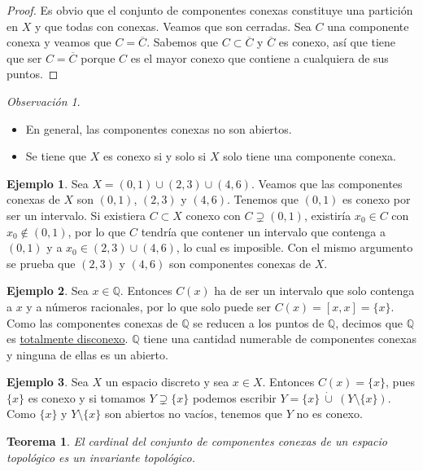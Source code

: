\documentclass[12pt]{report}
\newtheorem{theorem}{Teorema}[chapter]
\theoremstyle{definition}
\theoremstyle{definition}
\newtheorem{example}{Ejemplo}[chapter]
\theoremstyle{remark}
\newtheorem*{obs}{Observación} %
\newcommand{\Q}{\mathbb Q}
\begin{document}
\begin{proof}
Es obvio que el conjunto de componentes conexas constituye una partición en $X$ y que todas con conexas. Veamos que son cerradas. Sea $C$ una componente conexa y veamos que $C = \overline{C}$. Sabemos que $C \subset \overline{C}$ y $\overline{C}$ es conexo, así que tiene que ser $C = \overline{C}$ porque $C$ es el mayor conexo que contiene a cualquiera de sus puntos.
\end{proof}

\begin{obs}
\hfill
\begin{itemize}
    \item En general, las componentes conexas no son abiertos.
    \item Se tiene que $X$ es conexo si y solo si $X$ solo tiene una componente conexa.
\end{itemize}
\end{obs}

\begin{example}
Sea $X = (0,1) \cup (2,3) \cup (4,6)$. Veamos que las componentes conexas de $X$ son $(0,1)$, $(2,3)$ y $(4,6)$. Tenemos que $(0,1)$ es conexo por ser un intervalo. Si existiera $C \subset X$ conexo con $C \supsetneq (0,1)$, existiría $x_0 \in C$ con $x_0 \notin (0,1)$, por lo que $C$ tendría que contener un intervalo que contenga a $(0,1)$ y a $x_0 \in (2,3) \cup (4,6)$, lo cual es imposible. Con el mismo argumento se prueba que $(2,3)$ y $(4,6)$ son componentes conexas de $X$.
\end{example}

\begin{example}
Sea $x \in \Q$. Entonces $C(x)$ ha de ser un intervalo que solo contenga a $x$ y a números racionales, por lo que solo puede ser $C(x) = [x,x] = \{x\}$. Como las componentes conexas de $\Q$ se reducen a los puntos de $\Q$, decimos que $\Q$ es \underline{totalmente disconexo}. $\Q$ tiene una cantidad numerable de componentes conexas y ninguna de ellas es un abierto.
\end{example}

\begin{example}
Sea $X$ un espacio discreto y sea $x \in X$. Entonces $C(x) = \{x\}$, pues $\{x\}$ es conexo y si tomamos $Y \supsetneq \{x\}$ podemos escribir $Y = \{x\} \ \dot\cup \ (Y \setminus \{x\})$. Como $\{x\}$ y $Y \setminus \{x\}$ son abiertos no vacíos, tenemos que $Y$ no es conexo.
\end{example}

\vspace{2mm}
\begin{theorem}
\label{teo2.5.}
El cardinal del conjunto de componentes conexas de un espacio topológico es un invariante topológico.
\end{theorem}
\end{document}
